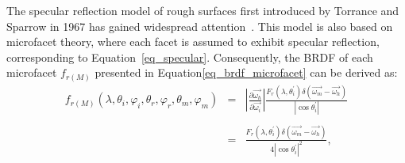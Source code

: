 The specular reflection model of rough surfaces first introduced by Torrance and Sparrow in 1967 has gained widespread attention~\cite{1995_Oren,2000_Meister,2010_Roser,2023_Lucas,2024_Lucas}.
This model is also based on microfacet theory, where each facet is assumed to exhibit specular reflection, corresponding to Equation~\eqref{eq_specular}.
Consequently, the BRDF of each microfacet $f_{r(M)}$ presented in Equation\eqref{eq_brdf_microfacet} can be derived as:
\[
    \begin{array}{lll}
        f_{r(M)}(\lambda, \theta_i, \varphi_i, \theta_r, \varphi_r, \theta_m, \varphi_m) & = & \displaystyle{\left|\frac{\partial \overrightarrow{\omega_h}}{\partial \overrightarrow{\omega_i}} \right| %
            \frac{F_r(\lambda, \theta_i^\prime)%
                \delta(\overrightarrow{\omega_m} - \overrightarrow{\omega_h})}%
            {\left| \cos\theta_i^\prime \right|}
        }                                                                                                                                                                                                \\ \\
                                                                                         & = & \displaystyle{
            \frac{F_r(\lambda, \theta_i^\prime)%
                \delta(\overrightarrow{\omega_m} - \overrightarrow{\omega_h})}%
            {4\left| \cos\theta_i^\prime \right|^2}
        },
    \end{array}
\]



